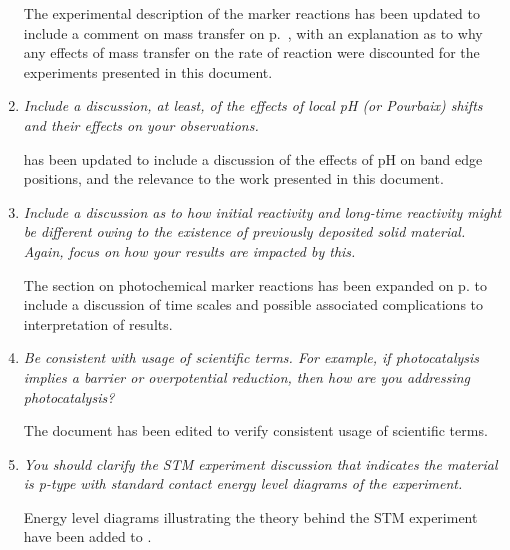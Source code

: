 \documentclass[12pt,%
               letterpaper,
               oneside]{uiothesis}
\begin{document}
\begin{enum}
\begin{enumerate}[label=\alph*,leftmargin=1em]
  The experimental description of the marker reactions has been updated to include a comment on mass transfer on p.~\pageref{masstransfer}, with an explanation as to why any effects of mass transfer on the rate of reaction were discounted for the experiments presented in this document.\vspace{16pt}
  
  \item \emph{Include a discussion, at least, of the effects of local pH (or Pourbaix) shifts and their effects on your observations.}\vspace{8pt}
  
   has been updated to include a discussion of the effects of pH on band edge positions, and the relevance to the work presented in this document.
 
  \vspace{16pt}
  
  \item \emph{Include a discussion as to how initial reactivity and long-time reactivity might be different owing to the existence of previously deposited solid material. Again, focus on how your results are impacted by this.}\vspace{8pt}
  
  The section on photochemical marker reactions has been expanded on p. \pageref{timescales} to include a discussion of time scales and possible associated complications to interpretation of results.
  
  \vspace{16pt}
  
  \item \emph{Be consistent with usage of scientific terms. For example, if photocatalysis implies a barrier or overpotential reduction, then how are you addressing photocatalysis?}\vspace{8pt}
  
  The document has been edited to verify consistent usage of scientific terms.
  
  \vspace{16pt}
  
  \item \emph{You should clarify the STM experiment discussion that indicates the material is p-type with standard contact energy level diagrams of the experiment.}\vspace{8pt}
  
  Energy level diagrams illustrating the theory behind the STM experiment have been added to .\vspace{16pt}
  

\end{enumerate}
\end{enum}
\end{document}
